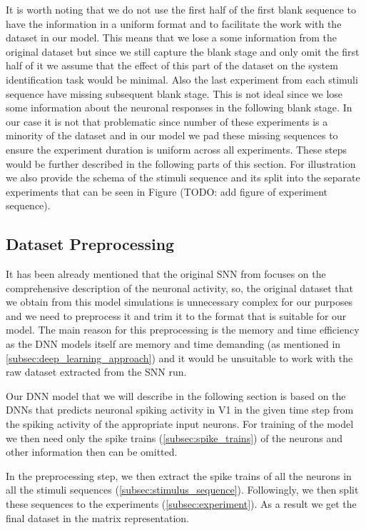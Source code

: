 It is worth noting that we do not use the first half of the first blank sequence to have the information in a uniform format and to facilitate the work with the dataset in our model. This means that we lose a some information from the original dataset but since we still capture the blank stage and only omit the first half of it we assume that the effect of this part of the dataset on the system identification task would be minimal. Also the last experiment from each stimuli sequence have missing subsequent blank stage. This is not ideal since we lose some information about the neuronal responses in the following blank stage. In our case it is not that problematic since number of these experiments is a minority of the dataset and in our model we pad these missing sequences to ensure the experiment duration is uniform across all experiments. These steps would be further described in the following parts of this section. For illustration we also provide the schema of the stimuli sequence and its split into the separate experiments that can be seen in Figure (TODO: add figure of experiment sequence).

\subsection{Dataset Preprocessing}
\label{subsec:dataset_preprocess}
It has been already mentioned that the original SNN from \citet{antolik2024comprehensive} focuses on the comprehensive description of the neuronal activity, so, the original dataset that we obtain from this model simulations is unnecessary complex for our purposes and we need to preprocess it and trim it to the format that is suitable for our model. The main reason for this preprocessing is the memory and time efficiency as the DNN models itself are memory and time demanding (as mentioned in \ref{subsec:deep_learning_approach}) and it would be unsuitable to work with the raw dataset extracted from the SNN run.

Our DNN model that we will describe in the following section is based on the DNNs that predicts neuronal spiking activity in V1 in the given time step from the spiking activity of the appropriate input neurons. For training of the model we then need only the spike trains (\ref{subsec:spike_trains}) of the neurons and other information then can be omitted.

In the preprocessing step, we then extract the spike trains of all the neurons in all the stimuli sequences (\ref{subsec:stimulus_sequence}). Followingly, we then split these sequences to the experiments (\ref{subsec:experiment}). As a result we get the final dataset in the matrix representation.

